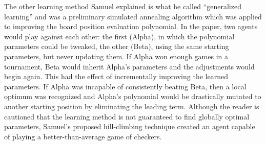 The other learning method Samuel explained is what he called
``generalized learning''
and was a preliminary simulated annealing algorithm
which was applied to improving the board position evaluation polynomial.
%
In the paper,
two agents would play against each other:
the first (Alpha), in which the polynomial parameters could be tweaked,
the other (Beta), using the same starting parameters, but never updating them.
%
If Alpha won enough games in a tournament,
Beta would inherit Alpha's parameters and the adjustments would begin again.
%
This had the effect of incrementally improving the learned parameters.
%
If Alpha was incapable of consistently beating Beta,
then a local optimum was recognized and Alpha's polynomial would be drastically
mutated to another starting position
by eliminating the leading term.
%
Although the reader is cautioned that the learning method is not guaranteed to
find globally optimal parameters,
Samuel's proposed hill-climbing technique created an agent capable
of playing a better-than-average game of checkers.


